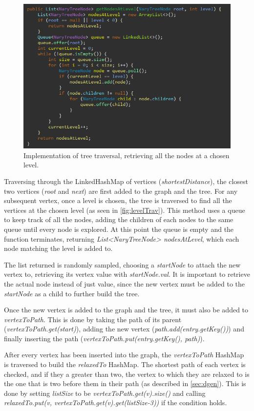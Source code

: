\documentclass{l4proj}
\begin{document}
\begin{figure}
    \centering
    \includegraphics[width=0.7\linewidth]{images/levelTrav.png}    

    \caption{Implementation of tree traversal, retrieving all the nodes at a chosen level.}
    \label{fig:levelTrav} 
\end{figure}

Traversing through the LinkedHashMap of vertices (\emph{shortestDistance}), the closest two vertices (\emph{root} and \emph{next}) are first added to the graph and the tree. For any subsequent vertex, once a level is chosen, the tree is traversed to find all the vertices at the chosen level (as seen in \autoref{fig:levelTrav}). This method uses a queue to keep track of all the nodes, adding the children of each nodes to the same queue until every node is explored. At this point the queue is empty and the function terminates, returning \emph{List<NaryTreeNode> nodesAtLevel}, which each node matching the level is added to.

The list returned is randomly sampled, choosing a \emph{startNode} to attach the new vertex to, retrieving its vertex value with \emph{startNode.val}. It is important to retrieve the actual node instead of just value, since the new vertex must be added to the \emph{startNode} as a child to further build the tree.

Once the new vertex is added to the graph and the tree, it must also be added to \emph{vertexToPath}. This is done by taking the path of its parent (\emph{vertexToPath.get(start)}), adding the new vertex (\emph{path.add(entry.getKey())}) and finally inserting the path (\emph{vertexToPath.put(entry.getKey(), path)}).

After every vertex has been inserted into the graph, the \emph{vertexToPath} HashMap is traversed to build the \emph{relaxedTo} HashMap. The shortest path of each vertex is checked, and if they a greater than two, the vertex to which they are relaxed to is the one that is two before them in their path (as described in \autoref{sec:dgen}). This is done by setting \emph{listSize} to be \emph{vertexToPath.get(v).size()} and calling \emph{relaxedTo.put(v, vertexToPath.get(v).get(listSize-3))} if the condition holds.
\end{document}
